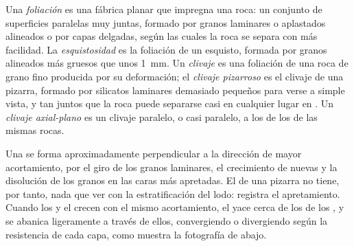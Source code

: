 \begin{definition}\label{def:b1:faults-folds-fabrics:foliation}
Una \emph{foliación} es una fábrica planar que impregna una roca: un conjunto de superficies paralelas muy
juntas, formado por granos laminares o aplastados alineados o por capas delgadas, según las cuales la roca se separa con más
facilidad. La \emph{esquistosidad} es la foliación de un esquisto, formada por granos alineados más gruesos
que unos \qty{1}{mm}. Un \emph{clivaje} es una foliación de una roca de grano fino producida por su
deformación; el \emph{clivaje pizarroso} es el clivaje de una pizarra, formado por silicatos laminares
demasiado pequeños para verse a simple vista, y tan juntos que la roca puede separarse casi en cualquier lugar en . Un \emph{clivaje axial-plano} es un clivaje paralelo, o casi paralelo, a los 
de los  de las mismas rocas.
\end{definition}

Una  se forma aproximadamente perpendicular a la dirección de mayor acortamiento, por el giro de los granos laminares,
el crecimiento de  nuevas y la disolución de los granos en las caras más apretadas. El  de una pizarra no tiene, por
tanto, nada que ver con la estratificación del lodo: registra el apretamiento. Cuando los  y el  crecen con el mismo
acortamiento, el  yace cerca de los  de los , y se abanica ligeramente a través de ellos, convergiendo
o divergiendo según la resistencia de cada capa, como muestra la fotografía de abajo.

